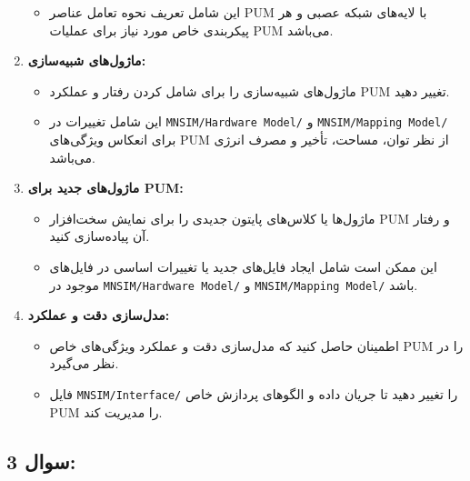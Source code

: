 \documentclass[12pt]{exam}
\begin{document}
\begin{questions}
\begin{enumerate}
\begin{itemize}
		\item این شامل تعریف نحوه تعامل عناصر PUM با لایه‌های شبکه عصبی و هر پیکربندی خاص مورد نیاز برای عملیات PUM می‌باشد.
	\end{itemize}
	
	\item \textbf{ماژول‌های شبیه‌سازی:}
	\begin{itemize}
		\item ماژول‌های شبیه‌سازی را برای شامل کردن رفتار و عملکرد PUM تغییر دهید.
		\item این شامل تغییرات در \texttt{MNSIM/Hardware Model/} و \texttt{MNSIM/Mapping Model/} برای انعکاس ویژگی‌های PUM از نظر توان، مساحت، تأخیر و مصرف انرژی می‌باشد.
	\end{itemize}
	
	\item \textbf{ماژول‌های جدید برای PUM:}
	\begin{itemize}
		\item ماژول‌ها یا کلاس‌های پایتون جدیدی را برای نمایش سخت‌افزار PUM و رفتار آن پیاده‌سازی کنید.
		\item این ممکن است شامل ایجاد فایل‌های جدید یا تغییرات اساسی در فایل‌های موجود در \texttt{MNSIM/Hardware Model/} و \texttt{MNSIM/Mapping Model/} باشد.
	\end{itemize}
	
	\item \textbf{مدل‌سازی دقت و عملکرد:}
	\begin{itemize}
		\item اطمینان حاصل کنید که مدل‌سازی دقت و عملکرد ویژگی‌های خاص PUM را در نظر می‌گیرد.
		\item فایل \texttt{MNSIM/Interface/} را تغییر دهید تا جریان داده و الگوهای پردازش خاص PUM را مدیریت کند.
	\end{itemize}
\end{enumerate}
	
	
	
	
	
	
	
	
	
	
	
	
	
	
	
	
	
	
	
	
	
	
	
	
	
	
	
	\subsection*{سوال 3:}
	

\end{questions}
\end{document}
